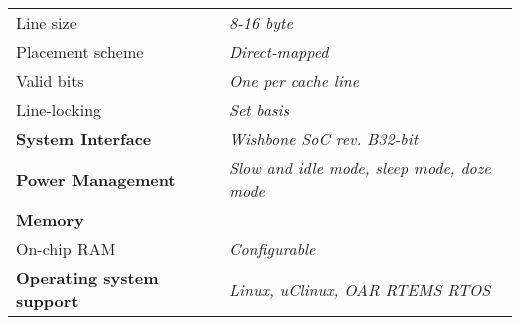 \documentclass[a4paper,10pt]{article}
\begin{document}
{{{\begin{center}
\begin{tabular}{ll}
\rowcolor{tcC}
Line size & \textit{8-16 byte}\\
\rowcolor{tcD}
Placement scheme & \textit{Direct-mapped}\\
\rowcolor{tcC}
Valid bits & \textit{One per cache line}\\
\rowcolor{tcD}
Line-locking & \textit{Set basis}\\
\rowcolor{tcC}
\textbf{System Interface} & \textit{Wishbone SoC rev. B32-bit}\\
\rowcolor{tcD}
\textbf{Power Management} & \textit{Slow and idle mode, sleep mode, doze mode}\\
\rowcolor{tcC}
\textbf{Memory} &  \\
\rowcolor{tcD}
On-chip RAM & \textit{Configurable} \\
\rowcolor{tcC}
\textbf{Operating system
support} & \textit{Linux, uClinux, OAR RTEMS RTOS}\\
\end{tabular}
\end{center}

}%
\vspace{0.7cm}
}


}
\end{document}
